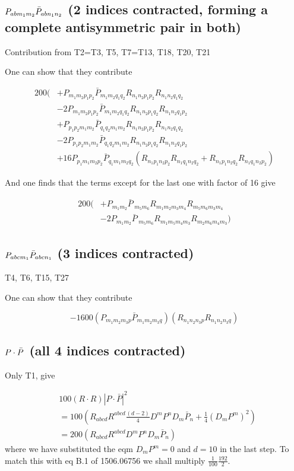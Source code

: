 \subsection{$P_{abm_1m_2}\bar{P}_{ab n_1 n_2}$ (2 indices contracted, forming a complete antisymmetric pair in both)}

Contribution from T2=T3, T5, T7=T13, T18, T20, T21

One can show that they contribute

\begin{align}
200(
    &+P_{m_1 m_2 p_1 p_2} \bar{P}_{m_1 m_2 q_1 q_2}
    R_{n_1 n_2 p_1 p_2} R_{n_1 n_2 q_1 q_2}\\
    &-2P_{m_1 m_2 p_1 p_2} \bar{P}_{m_1 m_2 q_1 q_2}
    R_{n_1 n_2 p_1 q_2} R_{n_1 n_2 q_1 p_2}\\
    &+P_{p_1 p_2 m_1 m_2} \bar{P}_{q_1 q_2 m_1 m_2}
    R_{n_1 n_2 p_1 p_2} R_{n_1 n_2 q_1 q_2}\\
    &-2P_{p_1 p_2 m_1 m_2} \bar{P}_{q_1 q_2 m_1 m_2}
    R_{n_1 n_2 p_1 q_2} R_{n_1 n_2 q_1 p_2}\\
    &+16 P_{p_1 m_1 m_2 p_2}\bar{P}_{q_1 m_1 m_2q_2}(R_{n_1 p_1 n_2 p_2}R_{n_1 q_1 n_2 q_2}+R_{n_1 p_1 n_2 q_2}R_{n_1 q_1 n_2 p_2}
)
\end{align}

And one finds that the terms except for the last one with factor of 16 give 

\begin{align}
200(&+P_{{m_{1}} {m_{2}}} \bar{P}\,_{{m_{5}} {m_{6}}} R_{{m_{1}} {m_{2}} {m_{3}} {m_{4}}} R_{{m_{5}} {m_{6}} {m_{3}} {m_{4}}}\\
&-2P_{{m_{1}} {m_{2}}} \bar{P}\,_{{m_{5}} {m_{6}}} R_{{m_{1}} {m_{5}} {m_{4}} {m_{3}}} R_{{m_{2}} {m_{6}} {m_{4}} {m_{3}}})
\end{align}

\subsection{$P_{abc m_1}\bar{P}_{abc n_1}$ (3 indices contracted)}

T4, T6, T15, T27

One can show that they contribute

\begin{equation}
-1600(P_{m_1m_2m_3 p}\bar{P}_{m_1 m_2 m_3 q})(R_{n_1 n_2 n_3 p}R_{n_1 n_2 n_3 q})
\end{equation}


\subsection{$P\cdot \bar{P}$ (all 4 indices contracted)}
Only T1, give

\begin{align}
&100 (R\cdot R) |P\cdot \bar{P}|^2\\
&=100(R_{abcd}R^{abcd} \frac{(d-2)}{4}D^m P^n D_m\bar{P}_n +\frac{1}{4}(D_m P^m)^2)\\
&=200(R_{abcd}R^{abcd}D^m P^n D_m\bar{P}_n)
\end{align}
where we have substituted the eqm $D_m P^m=0$ and $d=10$ in the last step.
To match this with eq B.1 of 1506.06756 we shall multiply $\frac{1}{100}\frac{192}{2}$.




